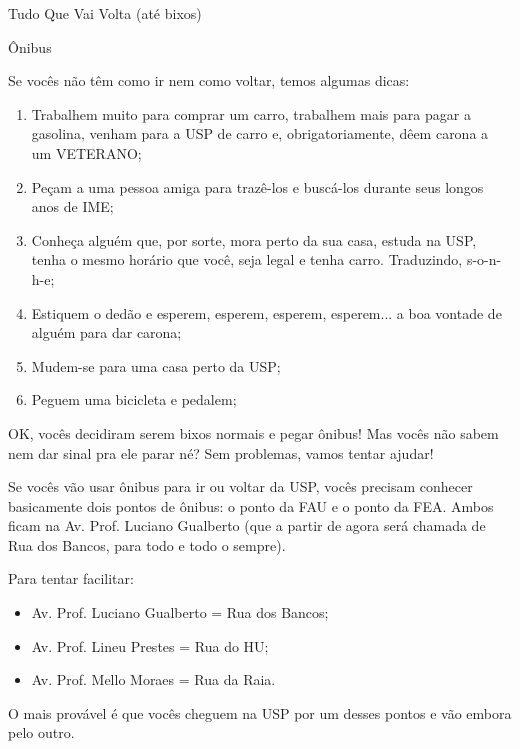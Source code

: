\begin{secao}{Tudo Que Vai Volta (até bixos)}

\begin{subsecao}{Ônibus}

Se vocês não têm como ir nem como voltar, temos algumas dicas:

\begin{enumerate}
  \item Trabalhem muito para comprar um carro,
  trabalhem mais para pagar a gasolina,
  venham para a USP de carro e, obrigatoriamente, dêem carona a um VETERANO;

  \item Peçam a uma pessoa amiga para trazê-los e buscá-los durante seus
  longos anos de IME;

  \item Conheça alguém que, por sorte, mora perto da sua casa, estuda na USP,
  tenha o mesmo horário que você, seja legal e tenha carro. Traduzindo, s-o-n-h-e;

  \item Estiquem o dedão e esperem, esperem, esperem, esperem... a boa vontade
  de alguém para dar carona;

  \item Mudem-se para uma casa perto da USP;

  \item Peguem uma bicicleta e pedalem;

\end{enumerate}

OK, vocês decidiram serem bixos normais e pegar ônibus! Mas vocês não sabem nem
dar sinal pra ele parar né? Sem problemas, vamos tentar ajudar!

Se vocês vão usar ônibus para ir ou voltar da USP, vocês precisam conhecer
basicamente dois pontos de ônibus: o ponto da FAU e o ponto da
FEA. Ambos ficam na Av. Prof. Luciano Gualberto (que a partir de agora será
chamada de Rua dos Bancos, para todo e todo o sempre).

Para tentar facilitar:
\begin{itemize}
	\item Av. Prof. Luciano Gualberto = Rua dos Bancos;
	\item Av. Prof. Lineu Prestes = Rua do HU;
	\item Av. Prof. Mello Moraes = Rua da Raia.
\end{itemize}

O mais provável é que vocês cheguem na USP por um desses
pontos e vão embora pelo outro.


\end{subsecao}
\end{secao}
